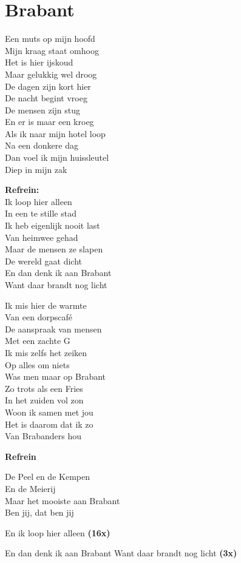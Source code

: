 \section{Brabant}
Een muts op mijn hoofd\\
Mijn kraag staat omhoog\\
Het is hier ijskoud\\
Maar gelukkig wel droog\\
De dagen zijn kort hier\\
De nacht begint vroeg\\
De mensen zijn stug\\
En er is maar een kroeg\\
Als ik naar mijn hotel loop\\
Na een donkere dag\\
Dan voel ik mijn huissleutel\\
Diep in mijn zak

\textbf{Refrein:}\\
Ik loop hier alleen\\
In een te stille stad\\
Ik heb eigenlijk nooit last\\
Van heimwee gehad\\
Maar de mensen ze slapen\\
De wereld gaat dicht\\
En dan denk ik aan Brabant\\
Want daar brandt nog licht

Ik mis hier de warmte\\
Van een dorpscafé\\
De aanspraak van mensen\\
Met een zachte G\\
Ik mis zelfs het zeiken\\
Op alles om niets\\
Was men maar op Brabant\\
Zo trots als een Fries\\
In het zuiden vol zon\\
Woon ik samen met jou\\
Het is daarom dat ik zo\\
Van Brabanders hou

\textbf{Refrein}

De Peel en de Kempen\\
En de Meierij\\
Maar het mooiste aan Brabant\\
Ben jij, dat ben jij

En ik loop hier alleen \textbf{(16x)}

En dan denk ik aan Brabant Want daar brandt nog licht \textbf{(3x)}
